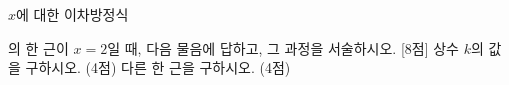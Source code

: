 $x$에 대한 이차방정식\par{}\noindent 의 한 근이 $x=2$일 때, 다음 물음에 답하고, 그 과정을 서술하시오.  \mbox{[8점]}
 상수 $k$의 값을 구하시오. (4점)
 다른 한 근을 구하시오. (4점)
